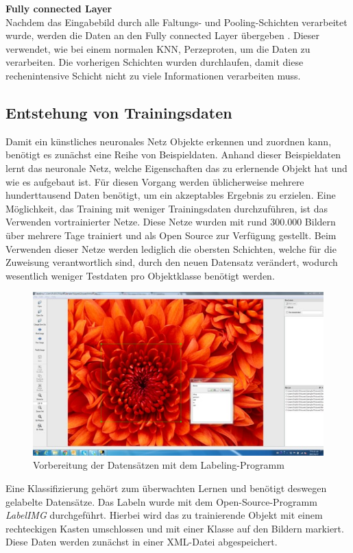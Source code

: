 \newpage
\textbf{Fully connected Layer}\\
Nachdem das Eingabebild durch alle Faltungs- und Pooling-Schichten verarbeitet wurde, werden die Daten an den Fully connected Layer übergeben \cite[14]{sermanet2012convolutional}. Dieser verwendet, wie bei einem normalen KNN, Perzeproten, um die Daten zu verarbeiten. Die vorherigen Schichten wurden durchlaufen, damit diese rechenintensive Schicht nicht zu viele Informationen verarbeiten muss. 
  \subsection{Entstehung von Trainingsdaten}\label{s.trainingsdaten} 
Damit ein künstliches neuronales Netz Objekte erkennen und zuordnen kann, benötigt es zunächst eine Reihe von Beispieldaten. Anhand dieser Beispieldaten lernt das neuronale Netz, welche Eigenschaften das zu erlernende Objekt hat und wie es aufgebaut ist. Für diesen Vorgang werden üblicherweise mehrere hunderttausend Daten benötigt, um ein akzeptables Ergebnis zu erzielen. Eine Möglichkeit, das Training mit weniger Trainingsdaten durchzuführen, ist das Verwenden vortrainierter Netze. Diese Netze wurden mit rund 300.000 Bildern über mehrere Tage trainiert und als Open Source zur Verfügung gestellt. Beim Verwenden dieser Netze werden lediglich die obersten Schichten, welche für die Zuweisung verantwortlich sind, durch den neuen Datensatz verändert, wodurch wesentlich weniger Testdaten pro Objektklasse benötigt werden. 
\begin{figure}
	[h]
	\centering
	\includegraphics[scale=0.7]{Sources/labelimg.jpg}
	\caption{Vorbereitung der Datensätzen mit dem Labeling-Programm \cite{labelimg2019}}
	\label{img:labelimg}
\end{figure}
Eine Klassifizierung gehört zum überwachten Lernen und benötigt deswegen gelabelte Datensätze. Das Labeln wurde mit dem Open-Source-Programm \textit{LabelIMG} \cite{labelimg2019} durchgeführt. Hierbei wird das zu trainierende Objekt mit einem rechteckigen Kasten umschlossen und mit einer Klasse auf den Bildern markiert. Diese Daten werden zunächst in einer XML-Datei abgespeichert. 

